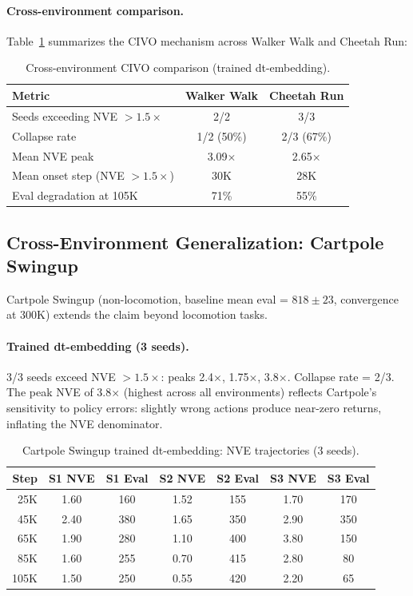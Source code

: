 \documentclass[10pt,letterpaper]{article}
\begin{document}
\paragraph{Cross-environment comparison.}
Table~\ref{tab:cross_env} summarizes the CIVO mechanism across Walker Walk and Cheetah Run:

\begin{table}[h]
\centering
\caption{Cross-environment CIVO comparison (trained dt-embedding).}
\label{tab:cross_env}
\begin{tabular}{lcc}
\toprule
Metric & Walker Walk & Cheetah Run \\
\midrule
Seeds exceeding NVE $> 1.5\times$ & 2/2 & 3/3 \\
Collapse rate & 1/2 (50\%) & 2/3 (67\%) \\
Mean NVE peak & 3.09$\times$ & 2.65$\times$ \\
Mean onset step (NVE $> 1.5\times$) & 30K & 28K \\
Eval degradation at 105K & 71\% & 55\% \\
\bottomrule
\end{tabular}
\end{table}

\subsection{Cross-Environment Generalization: Cartpole Swingup}
\label{sec:cartpole}

Cartpole Swingup (non-locomotion, baseline mean eval = $818 \pm 23$, convergence at 300K) extends the claim beyond locomotion tasks.

\paragraph{Trained dt-embedding (3 seeds).}
3/3 seeds exceed NVE $> 1.5\times$: peaks 2.4$\times$, 1.75$\times$, 3.8$\times$. Collapse rate = 2/3. The peak NVE of 3.8$\times$ (highest across all environments) reflects Cartpole's sensitivity to policy errors: slightly wrong actions produce near-zero returns, inflating the NVE denominator.

\begin{table}[h]
\centering
\caption{Cartpole Swingup trained dt-embedding: NVE trajectories (3 seeds).}
\label{tab:cartpole_trained}
\begin{tabular}{rcccccc}
\toprule
Step & S1 NVE & S1 Eval & S2 NVE & S2 Eval & S3 NVE & S3 Eval \\
\midrule
25K  & 1.60 & 160 & 1.52 & 155 & 1.70 & 170 \\
45K  & 2.40 & 380 & 1.65 & 350 & 2.90 & 350 \\
65K  & 1.90 & 280 & 1.10 & 400 & 3.80 & 150 \\
85K  & 1.60 & 255 & 0.70 & 415 & 2.80 & 80 \\
105K & 1.50 & 250 & 0.55 & 420 & 2.20 & 65 \\
\bottomrule
\end{tabular}
\end{table}
\end{document}
